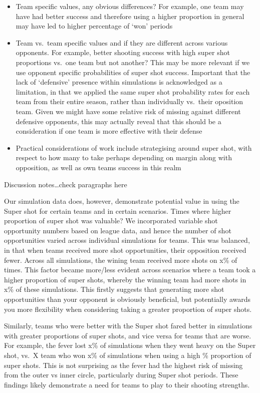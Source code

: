 \documentclass[]{elsarticle} %
\providecommand{\tightlist}{%
  \setlength{\itemsep}{0pt}\setlength{\parskip}{0pt}}
\begin{document}
\begin{itemize}
\tightlist
\item
  Team specific values, any obvious differences? For example, one team
  may have had better success and therefore using a higher proportion in
  general may have led to higher percentage of `won' periods
\item
  Team vs.~team specific values and if they are different across various
  opponents. For example, better shooting success with high super shot
  proportions vs.~one team but not another? This may be more relevant if
  we use opponent specific probabilities of super shot success.
  Important that the lack of `defensive' presence within simulations is
  acknowledged as a limitation, in that we applied the same super shot
  probability rates for each team from their entire season, rather than
  individually vs.~their oposition team. Given we might have some
  relative risk of missing against different defensive opponents, this
  may actually reveal that this should be a consideration if one team is
  more effective with their defense
\item
  Practical considerations of work include strategising around super
  shot, with respect to how many to take perhaps depending on margin
  along with opposition, as well as own teams success in this realm
\end{itemize}

Discussion notes\ldots check paragraphs here

Our simulation data does, however, demonstrate potential value in using
the Super shot for certain teams and in certain scenarios. Times where
higher proportion of super shot was valuable? We incorporated variable
shot opportunity numbers based on league data, and hence the number of
shot opportunities varied across individual simulations for teams. This
was balanced, in that when teams received more shot opportunities, their
opposition received fewer. Across all simulations, the wining team
received more shots on x\% of times. This factor became more/less
evident across scenarios where a team took a higher proportion of super
shots, whereby the winning team had more shots in x\% of these
simulations. This firstly suggests that generating more shot
opportunities than your opponent is obviously beneficial, but
potentially awards you more flexibility when considering taking a
greater proportion of super shots.

Similarly, teams who were better with the Super shot fared better in
simulations with greater proportions of super shots, and vice versa for
teams that are worse. For example, the fever lost x\% of simulations
when they went heavy on the Super shot, vs.~X team who won x\% of
simulations when using a high \% proportion of super shots. This is not
surprising as the fever had the highest risk of missing from the outer
vs inner circle, particularly during Super shot periods. These findings
likely demonstrate a need for teams to play to their shooting strengths.
\end{document}
